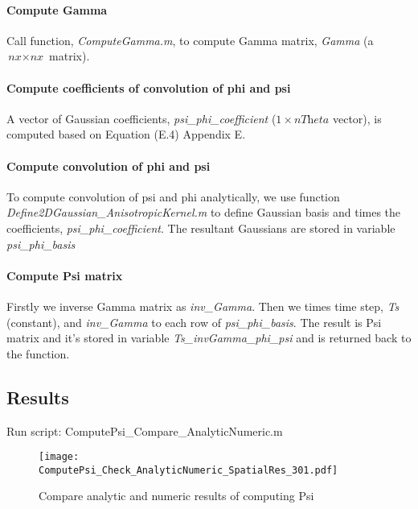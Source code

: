 \documentclass[a4paper, 12pt, english]{article}
\begin{document}
\paragraph{Compute Gamma\newline}
Call function, \textit{ComputeGamma.m}, to compute Gamma matrix, \textit{Gamma} (a \(\textit{nx}\times
\textit{nx}\) matrix).\newline

\paragraph{Compute coefficients of convolution of phi and psi\newline}
A vector of Gaussian coefficients, \textit{psi\_phi\_coefficient} (\(1\times\textit{nTheta}\) vector), is computed based on Equation
(E.4) Appendix E.

\paragraph{Compute convolution of phi and psi\newline}
To compute convolution of psi and phi analytically, we use function \textit{Define2DGaussian\_AnisotropicKernel.m}
to define Gaussian basis and times the coefficients, \textit{psi\_phi\_coefficient}.
The resultant Gaussians are stored in variable \textit{psi\_phi\_basis}

\paragraph{Compute Psi matrix\newline}
Firstly we inverse Gamma matrix as \textit{inv\_Gamma}. Then we times time step, \textit{Ts} (constant), and \textit{inv\_Gamma} to each row of \textit{psi\_phi\_basis}.
The result is Psi matrix and it's stored in variable \textit{Ts\_invGamma\_phi\_psi} and is returned back to the function.

\subsection{Results}
Run script: ComputePsi\_Compare\_AnalyticNumeric.m
\begin{figure}[H]
\centering
\texttt{[image: ComputePsi\_Check\_AnalyticNumeric\_SpatialRes\_301.pdf]}
\caption{Compare analytic and numeric results of computing Psi}
\end{figure}
\newpage
\end{document}
